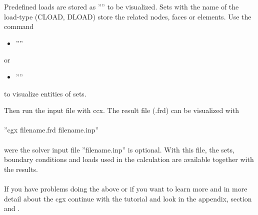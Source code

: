 \documentclass{article}
\begin{document}
Predefined loads are stored as '''' to be visualized. Sets with the name of the load-type (CLOAD, DLOAD) store the related nodes, faces or elements. Use the command
\begin{itemize}
\item ''''
\end{itemize}
or
\begin{itemize}
\item ''''
\end{itemize}
to visualize entities of sets.

Then run the input file with ccx. The result file (.frd) can be visualized with\\\\  ''cgx filename.frd filename.inp''\\\\were the solver input file ''filename.inp'' is optional. With this file, the sets, boundary conditions and loads used in the calculation are available together with the results.\\\\If you have problems doing the above or if you want to learn more and in more detail about the cgx continue with the tutorial \cite{tutorial} and look in the appendix, section  and .    
\end{document}

